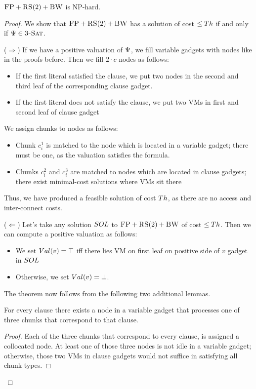 \begin{theorem}
$\textsc{FP}+\textsc{RS}(2)+\textsc{BW}$ is NP-hard.
\end{theorem}
\begin{proof}
We show that $\textsc{FP}+\textsc{RS}(2)+\textsc{BW}$ has a solution of cost $\leq
  Th$ if and only if $\Psi \in \textsc{3-Sat}$.
  
($\Rightarrow$) If we have a positive valuation of $\Psi$, we fill variable gadgets with nodes like in
the proofs before. Then we fill $2 \cdot c$ nodes as follows:
\begin{itemize}
\item If the first literal satisfied the clause, we put two nodes in the second and
third leaf of the corresponding clause gadget.
\item If the first literal does not satisfy the clause, we put two VMs in first
and second leaf of clause gadget
\end{itemize}

We assign chunks to nodes as follows:
\begin{itemize}
\item Chunk $c_i^1$ is matched to the node which is located in a variable gadget; there
must be one, as the valuation satisfies the formula.
\item Chunks $c_i^2$ and $c_i^3$ are matched to nodes which are
located in clause
gadgets; there exist minimal-cost solutions where VMs sit there
\end{itemize}

Thus, we have produced a feasible solution of cost $Th$, as there are no
access and inter-connect costs. 

($\Leftarrow$) 
Let's take any solution $SOL$ to $\textsc{FP}+\textsc{RS}(2)+\textsc{BW}$ of cost $\leq Th$.
Then we can compute a positive valuation as follows:
\begin{itemize}
\item We set $Val(v) = \top$ iff there lies VM on first leaf on positive side of $v$ gadget in $SOL$
\item Otherwise, we set $Val(v) = \bot$.
\end{itemize}

The theorem now follows from the following two additional lemmas.
\begin{lemma}
For every clause there exists a node in a variable gadget that processes one of
  three chunks that correspond to that clause.
\end{lemma}
\begin{proof}
 Each of the three chunks that correspond to every clause,
 is assigned a collocated node. 
 At least one of those three nodes is not idle in a variable gadget;
otherwise, those two VMs in clause gadgets would not suffice in
satisfying all chunk types.\end{proof}


\end{proof}

